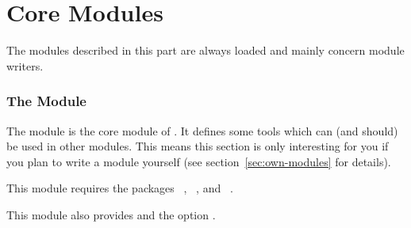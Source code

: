 \documentclass{chemmacros-manual}
\begin{document}
\part{Core Modules}\label{part:core-modules}
The modules described in this part are always loaded and mainly concern module
writers.

\section{The  Module}\label{sec:base-module}

The  module is the core module of \chemmacros. It defines
some tools which can (and should) be used in other modules.  This means this
section is only interesting for you if you plan to write a module yourself
(see section~\vref{sec:own-modules} for details).

This module requires the packages ~\cite{pkg:bm}, 
~\cite{pkg:amstext}, and ~\cite{pkg:etoolbox}.

This module also provides  and the option .
\end{document}
